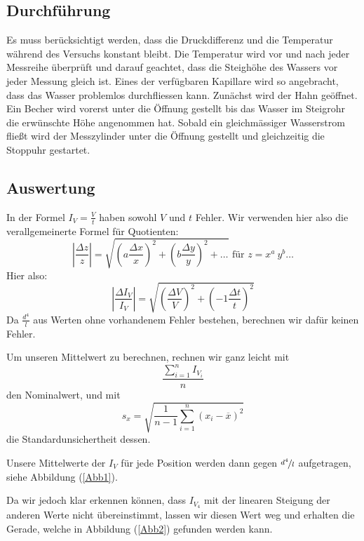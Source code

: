 \documentclass[11pt,a4paper]{article}
\begin{document}
\pagebreak

\subsection{Durchführung}

Es muss berücksichtigt werden, dass die Druckdifferenz und die Temperatur während des Versuchs konstant bleibt. Die Temperatur wird vor und nach jeder Messreihe überprüft und darauf geachtet, dass die Steighöhe des Wassers vor jeder Messung gleich ist. Eines der verfügbaren Kapillare wird so angebracht, dass das Wasser problemlos durchfliessen kann. Zunächst wird der Hahn geöffnet. Ein Becher wird vorerst unter die Öffnung gestellt bis das Wasser im Steigrohr die erwünschte Höhe angenommen hat. Sobald ein gleichmässiger Wasserstrom fließt wird der Messzylinder unter die Öffnung gestellt und gleichzeitig die Stoppuhr gestartet. 

\subsection{Auswertung}

In der Formel $I_V=\frac{V}{t}$ haben sowohl $V$ und $t$ Fehler. Wir verwenden hier also die verallgemeinerte Formel f\"ur Quotienten:
$$
\left\vert\frac{\Delta z}{z}\right\vert=\sqrt{\left(a\frac{\Delta x}{x}\right)^2+\left(b\frac{\Delta y}{y}\right)^2+\ldots}\textrm{ f\"ur }z=x^a\ y^b\ldots
$$
Hier also:
$$
\left\vert\frac{\Delta I_V}{I_V}\right\vert=\sqrt{\left(\frac{\Delta V}{V}\right)^2+\left(-1\frac{\Delta t}{t}\right)^2}
$$
Da $\frac{d^4}{l}$ aus Werten ohne vorhandenem Fehler bestehen, berechnen wir daf\"ur keinen Fehler.

Um unseren Mittelwert zu berechnen, rechnen wir ganz leicht mit 
\begin{equation}
\frac{\sum_{i=1}^n I_{V_i}}{n}\label{mean}
\end{equation}
den Nominalwert, und mit
\begin{equation}
s_x=\sqrt{\frac{1}{n-1}\sum_{i=1}^n(x_i-\overline{x})^2}\label{meanstd}
\end{equation}
die Standardunsichertheit dessen.

Unsere Mittelwerte der $I_V$ f\"ur jede Position werden dann gegen $\nicefrac{d^4}{l}$ aufgetragen, siehe Abbildung (\ref{Abb1}).

Da wir jedoch klar erkennen k\"onnen, dass $I_{V_4}$ mit der linearen Steigung der anderen Werte nicht \"ubereinstimmt, lassen wir diesen Wert weg und erhalten die Gerade, welche in Abbildung (\ref{Abb2}) gefunden werden kann.
\end{document}
